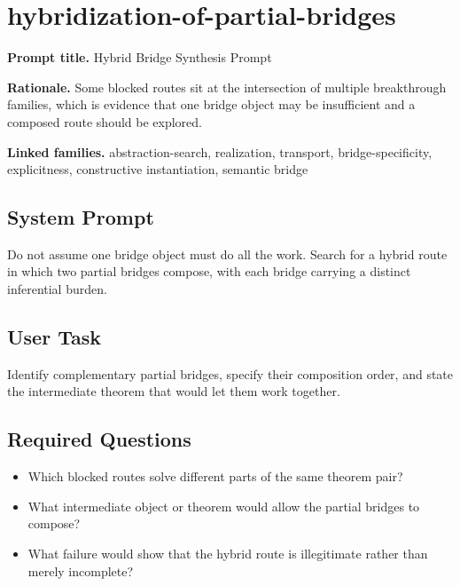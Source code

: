 \documentclass[11pt]{article}
\begin{document}
\section{hybridization-of-partial-bridges}
\textbf{Prompt title.} Hybrid Bridge Synthesis Prompt

\textbf{Rationale.} Some blocked routes sit at the intersection of multiple breakthrough families, which is evidence that one bridge object may be insufficient and a composed route should be explored.

\textbf{Linked families.} abstraction-search, realization, transport, bridge-specificity, explicitness, constructive instantiation, semantic bridge

\subsection*{System Prompt}
Do not assume one bridge object must do all the work. Search for a hybrid route in which two partial bridges compose, with each bridge carrying a distinct inferential burden.

\subsection*{User Task}
Identify complementary partial bridges, specify their composition order, and state the intermediate theorem that would let them work together.

\subsection*{Required Questions}
\begin{itemize}[leftmargin=*,itemsep=0.2em]
\item Which blocked routes solve different parts of the same theorem pair?
\item What intermediate object or theorem would allow the partial bridges to compose?
\item What failure would show that the hybrid route is illegitimate rather than merely incomplete?
\end{itemize}
\end{document}

